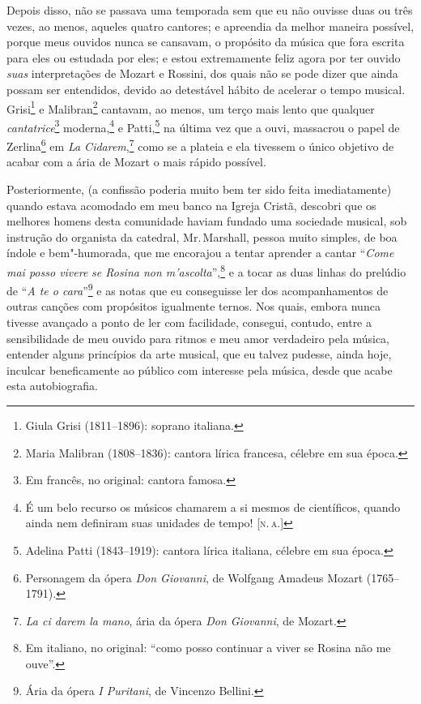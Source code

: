 Depois disso, não se passava uma temporada sem que eu não ouvisse duas
ou três vezes, ao menos, aqueles quatro cantores; e apreendia da melhor
maneira possível, porque meus ouvidos nunca se cansavam, o propósito da
música que fora escrita para eles ou estudada por eles; e estou
extremamente feliz agora por ter ouvido \textit{suas} interpretações de
Mozart e Rossini, dos quais não se pode dizer que ainda possam ser
entendidos, devido ao detestável hábito de acelerar o tempo musical.
Grisi\footnote{Giula Grisi (1811--1896): soprano italiana.}
e Malibran\footnote{Maria Malibran (1808--1836): cantora lírica francesa,
  célebre em sua época.} cantavam, ao menos, um terço
mais lento que qualquer \textit{cantatrice}\footnote{Em francês, no
  original: cantora famosa.} moderna,\footnote{É um belo
  recurso os músicos chamarem a si mesmos de científicos, quando ainda
  nem definiram suas unidades de tempo! {[}\textsc{n.\,a.}{]}} e
Patti,\footnote{Adelina Patti (1843--1919): cantora lírica italiana,
  célebre em sua época.} na última vez que a ouvi,
massacrou o papel de Zerlina\footnote{Personagem da ópera \textit{Don
  Giovanni}, de Wolfgang Amadeus Mozart (1765--1791).} em
\textit{La Cidarem},\footnote{\textit{La ci darem la mano}, ária da ópera
  \textit{Don Giovanni}, de Mozart.} como se a plateia e
ela tivessem o único objetivo de acabar com a ária de Mozart o mais
rápido possível.

Posteriormente, (a confissão poderia muito bem ter sido feita
imediatamente) quando estava acomodado em meu banco na Igreja Cristã,
descobri que os melhores homens desta comunidade haviam fundado uma
sociedade musical, sob instrução do organista da catedral, Mr.\,Marshall,
pessoa muito simples, de boa índole e bem"-humorada, que me encorajou a
tentar aprender a cantar ``\textit{Come mai posso vivere} \textit{se Rosina
non m'ascolta}'',\footnote{Em italiano, no original: ``como posso continuar
  a viver se Rosina não me ouve''.} e a tocar as duas
linhas do prelúdio de ``\textit{A te o cara}''\footnote{Ária da ópera
  \textit{I Puritani}, de Vincenzo Bellini.} e as
notas que eu conseguisse ler dos acompanhamentos de outras canções com
propósitos igualmente ternos. Nos quais, embora nunca tivesse avançado a
ponto de ler com facilidade, consegui, contudo, entre a sensibilidade de
meu ouvido para ritmos e meu amor verdadeiro pela música, entender
alguns princípios da arte musical, que eu talvez pudesse, ainda hoje,
inculcar beneficamente ao público com interesse pela música, desde que
acabe esta autobiografia.

